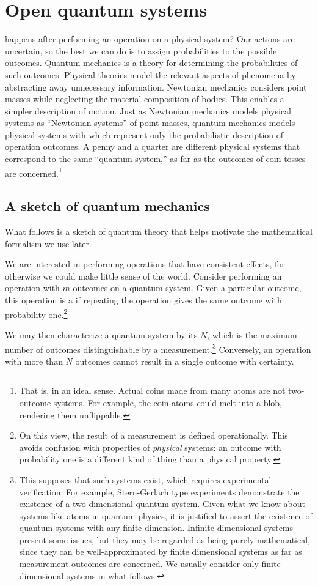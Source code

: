 \documentclass[../thesis.tex]{subfiles}
\begin{document}
\chapter{Open quantum systems}

 happens after performing an operation on a physical system?
Our actions are uncertain, so the best we can do is to assign probabilities to
the possible outcomes. Quantum mechanics is a theory for determining the
probabilities of such outcomes. Physical theories model the relevant aspects of
phenomena by abstracting away unnecessary information. Newtonian mechanics
considers point masses while neglecting the material composition of bodies. This
enables a simpler description of motion. Just as Newtonian mechanics models
physical systems as ``Newtonian systems'' of point masses, quantum mechanics
models physical systems with  which
represent only the probabilistic description of operation outcomes. A penny and
a quarter are different physical systems that correspond to the same ``quantum
system{,}'' as far as the outcomes of coin tosses are concerned.\footnote{%
  That is, in an ideal sense. Actual coins made from many atoms are not
  two-outcome systems. For example, the coin atoms could melt into a blob,
  rendering them unflippable.
}

\section{A sketch of quantum mechanics}

What follows is a sketch of quantum theory that helps motivate the mathematical
formalism we use later.

We are interested in performing operations that have consistent effects, for
otherwise we could make little sense of the world. Consider performing an
operation with $m$ outcomes on a quantum system. Given a particular outcome,
this operation is a  if repeating the operation gives the same
outcome with probability one.\footnote{%
  On this view, the result of a measurement is defined operationally. This
  avoids confusion with properties of \emph{physical} systems: an outcome with
  probability one is a different kind of thing than a physical property.
}

We may then characterize a quantum system by its  $N$, which is
the maximum number of outcomes distinguishable by a measurement.\footnote{%
  This supposes that such systems exist, which requires experimental
  verification. For example, Stern-Gerlach type experiments demonstrate the
  existence of a two-dimensional quantum system. Given what we know about
  systems like atoms in quantum physics, it is justified to assert the existence
  of quantum systems with any finite dimension. Infinite dimensional systems
  present some issues, but they may be regarded as being purely mathematical,
  since they can be well-approximated by finite dimensional systems as far as
  measurement outcomes are concerned. We usually consider only
  finite-dimensional systems in what follows.
}
Conversely, an operation with more than $N$ outcomes cannot result in a single
outcome with certainty.
\end{document}
